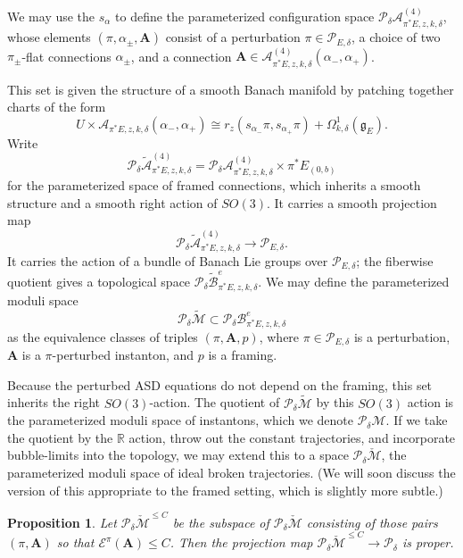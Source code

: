 \documentclass{memo-l}
\newcommand{\pE}{\pi^* \! E}
\newtheorem{proposition}[theorem]{Proposition}
\theoremstyle{definition}
\theoremstyle{remark}
\numberwithin{section}{chapter}
\numberwithin{equation}{chapter}
\begin{document}
We may use the $s_\alpha$ to define the parameterized configuration space $\mathcal P_\delta \mathcal A^{(4)}_{\pE,z,k,\delta}$, whose elements $(\pi, \alpha_\pm, \mathbf{A})$ consist of a perturbation $\pi \in \mathcal P_{E,\delta}$, a choice of two $\pi_\pm$-flat connections $\alpha_\pm$, and a connection $\mathbf{A} \in \mathcal A^{(4)}_{\pE,z,k,\delta}(\alpha_-, \alpha_+)$.

This set is given the structure of a smooth Banach manifold by patching together charts of the form $$U \times \mathcal A_{\pE,z,k,\delta}(\alpha_-,\alpha_+) \cong r_z(s_{\alpha_-} \pi, s_{\alpha_+} \pi) + \Omega^1_{k,\delta}(\mathfrak g_E).$$ Write $$\mathcal P_\delta \widetilde{\mathcal A}^{(4)}_{\pE,z,k,\delta} = \mathcal P_\delta \mathcal A^{(4)}_{\pE,z,k,\delta} \times \pE_{(0,b)}$$ for the parameterized space of framed connections, which inherits a smooth structure and a smooth right action of $SO(3)$. It carries a smooth projection map 
$$\mathcal P_{\delta} \widetilde{\mathcal A}^{(4)}_{\pE,z,k,\delta} \to \mathcal P_{E,\delta}.$$
It carries the action of a bundle of Banach Lie groups over $\mathcal P_{E,\delta}$; the fiberwise quotient gives a topological space $\mathcal P_{\delta} \widetilde{\mathcal B}^e_{\pE,z,k,\delta}$. We may define the parameterized moduli space 
$$\mathcal P_{\delta} \widetilde{\mathcal M} \subset \mathcal P_{\delta} \mathcal B^e_{\pE,z,k,\delta}$$ 
as the equivalence classes of triples $(\pi, \mathbf{A},p)$, where $\pi \in \mathcal P_{E,\delta}$ is a perturbation, $\mathbf{A}$ is a $\pi$-perturbed instanton, and $p$ is a framing. 

Because the perturbed ASD equations do not depend on the framing, this set inherits the right $SO(3)$-action. The quotient of $\mathcal P_{\delta} \widetilde{\mathcal M}$ by this $SO(3)$ action is the parameterized moduli space of instantons, which we denote $\mathcal P_\delta \mathcal M$. If we take the quotient by the $\mathbb R$ action, throw out the constant trajectories, and incorporate bubble-limits into the topology, we may extend this to a space $\mathcal P_\delta \check{\mathcal M}$, the parameterized moduli space of ideal broken trajectories. (We will soon discuss the version of this appropriate to the framed setting, which is slightly more subtle.)

\begin{proposition}\label{properflowlines}Let $\mathcal P_{\delta} \check{\mathcal M}^{\leq C}$ be the subspace of $\mathcal P_{\delta} \check{\mathcal M}$ consisting of those pairs $(\pi, \mathbf{A})$ so that $\mathcal E^\pi(\mathbf{A}) \leq C$. Then the projection map $\mathcal P_{\delta} \check{\mathcal M}^{\leq C} \to \mathcal P_{\delta}$ is proper.
\end{proposition}
\end{document}
